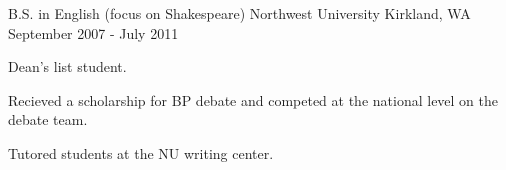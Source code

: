 

\begin{cventries}

  \cventry
    {B.S. in English (focus on Shakespeare)} %
    {Northwest University} %
    {Kirkland, WA} %
    {September 2007 - July 2011} %
    {
      \begin{cvitems} %
        \item {Dean's list student.}
        \item {Recieved a scholarship for BP debate and competed at the national level on the debate team.}
        \item {Tutored students at the NU writing center.}
      \end{cvitems}
    }

\end{cventries}
